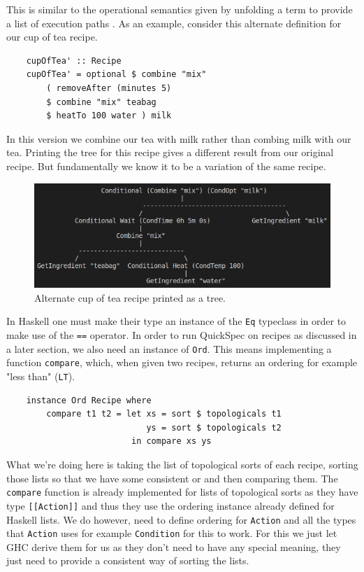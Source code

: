 \documentclass[11pt]{article}
\begin{document}
This is similar to the operational semantics given by unfolding a
term to provide a list of execution paths \cite{hutton}. As an example,
consider this alternate definition for our cup of tea recipe.

\begin{lstlisting}
    cupOfTea' :: Recipe
    cupOfTea' = optional $ combine "mix" 
        ( removeAfter (minutes 5)
        $ combine "mix" teabag
        $ heatTo 100 water ) milk
\end{lstlisting}

In this version we combine our tea with milk rather than combing milk with our tea.
Printing the tree for this recipe gives a different result from our original recipe.
But fundamentally we know it to be a variation of the same recipe.

\begin{figure}[h]
\includegraphics[width=\textwidth, keepaspectratio]{cupOfTea2.png}
\centering
\caption{Alternate cup of tea recipe printed as a tree.}
\end{figure}

In Haskell one must make their type an instance of the \texttt{Eq} typeclass in
order to make use of the \texttt{==} operator. In order to run QuickSpec on recipes
as discussed in a later section, we also need an instance of \texttt{Ord}.
This means implementing a function \texttt{compare}, which, when given two recipes,
returns an ordering for example "less than" (\texttt{LT}).

\begin{lstlisting}
    instance Ord Recipe where
        compare t1 t2 = let xs = sort $ topologicals t1
                            ys = sort $ topologicals t2
                         in compare xs ys
\end{lstlisting}

What we're doing here is taking the list of topological sorts of each recipe, sorting those
lists so that we have some consistent or and then comparing them. The \texttt{compare} function
is already implemented for lists of topological sorts as they have type \texttt{[[Action]]}
and thus they use the ordering instance already defined for Haskell lists. We do however,
need to define ordering for \texttt{Action} and all the types that \texttt{Action} uses
for example \texttt{Condition} for this to work. For this we just let GHC derive them for
us as they don't need to have any special meaning, they just need to provide a consistent
way of sorting the lists.
\end{document}
